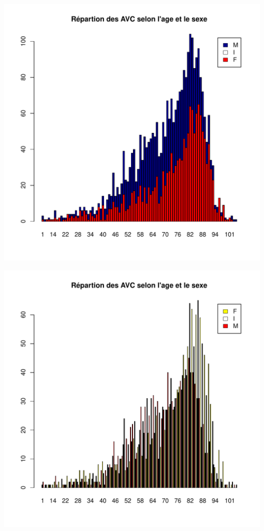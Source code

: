 \documentclass[12pt,english,french,twoside]{book}\usepackage[]{graphicx}\usepackage[]{color}
\makeatletter
\def\maxwidth{ %
  \ifdim\Gin@nat@width>\linewidth
    \linewidth
  \else
    \Gin@nat@width
  \fi
}
\newenvironment{knitrout}{}{} %
\makeatother
\begin{document}
\begin{knitrout}
\includegraphics[width=\maxwidth]{figure/avc_sexe3} 

\includegraphics[width=\maxwidth]{figure/avc_sexe4} 

\end{knitrout}
\end{document}
